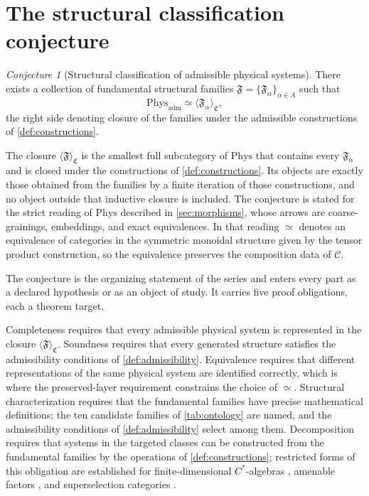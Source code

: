 \documentclass[11pt,letterpaper]{article}
\theoremstyle{definition}
\theoremstyle{remark}
\newtheorem{conjecture}[conjecture]{Conjecture}
\begin{document}
\section{The structural classification conjecture}

\begin{conjecture}[Structural classification of admissible physical systems]
\label{conj:cmrps}
There exists a collection of fundamental structural families $\mathfrak{F} = \{\mathfrak{F}_\alpha\}_{\alpha \in A}$ such that
\[
  \mathrm{Phys}_{\mathrm{adm}} \simeq \langle \mathfrak{F}_\alpha \rangle_{\mathfrak{C}},
\]
the right side denoting closure of the families under the admissible constructions of \cref{def:constructions}.
\end{conjecture}

The closure $\langle \mathfrak{F} \rangle_{\mathfrak{C}}$ is the smallest full subcategory of $\mathrm{Phys}$ that contains every $\mathfrak{F}_\alpha$ and is closed under the constructions of \cref{def:constructions}. Its objects are exactly those obtained from the families by a finite iteration of those constructions, and no object outside that inductive closure is included. The conjecture is stated for the strict reading of $\mathrm{Phys}$ described in \cref{sec:morphisms}, whose arrows are coarse-grainings, embeddings, and exact equivalences. In that reading $\simeq$ denotes an equivalence of categories in the symmetric monoidal structure given by the tensor product construction, so the equivalence preserves the composition data of $\mathcal{C}$.

The conjecture is the organizing statement of the series and enters every part as a declared hypothesis or as an object of study. It carries five proof obligations, each a theorem target.

Completeness requires that every admissible physical system is represented in the closure $\langle \mathfrak{F} \rangle_{\mathfrak{C}}$. Soundness requires that every generated structure satisfies the admissibility conditions of \cref{def:admissibility}. Equivalence requires that different representations of the same physical system are identified correctly, which is where the preserved-layer requirement \cite{corpus-74} constrains the choice of $\simeq$. Structural characterization requires that the fundamental families have precise mathematical definitions; the ten candidate families of \cref{tab:ontology} are named, and the admissibility conditions of \cref{def:admissibility} select among them. Decomposition requires that systems in the targeted classes can be constructed from the fundamental families by the operations of \cref{def:constructions}; restricted forms of this obligation are established for finite-dimensional $C^*$-algebras \cite{corpus-9}, amenable factors \cite{corpus-62,corpus-64}, and superselection categories \cite{corpus-12,corpus-67}.
\end{document}
